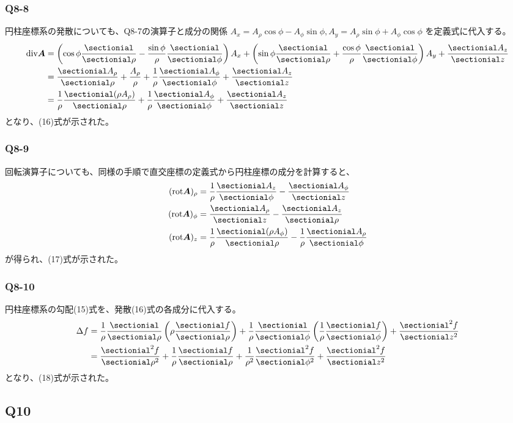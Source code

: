\documentclass[platex,dvipdfmx,a4paper]{jsarticle}
\newcommand{\hb}[2]{\frac{\sectionial #1}{\sectionial #2}}
\newcommand{\vect}[1]{\boldsymbol{#1}}
\begin{document}
  \subsubsection*{Q8-8}
  円柱座標系の発散についても、Q8-7の演算子と成分の関係 $A_x = A_\rho \cos{\phi} - A_\phi \sin{\phi}, A_y = A_\rho \sin{\phi} + A_\phi \cos{\phi}$ を定義式に代入する。
  \begin{align*}
    \text{div} \vect{A} &= \left( \cos{\phi}\hb{}{\rho} - \frac{\sin{\phi}}{\rho}\hb{}{\phi} \right) A_x + \left( \sin{\phi}\hb{}{\rho} + \frac{\cos{\phi}}{\rho}\hb{}{\phi} \right) A_y + \hb{A_z}{z} \\
    &= \hb{A_\rho}{\rho} + \frac{A_\rho}{\rho} + \frac{1}{\rho}\hb{A_\phi}{\phi} + \hb{A_z}{z} \\
    &= \frac{1}{\rho}\hb{(\rho A_\rho)}{\rho} + \frac{1}{\rho}\hb{A_\phi}{\phi} + \hb{A_z}{z}
  \end{align*}
  となり、(16)式が示された。

  \subsubsection*{Q8-9}
  回転演算子についても、同様の手順で直交座標の定義式から円柱座標の成分を計算すると、
  \begin{align*}
    (\text{rot} \vect{A})_\rho &= \frac{1}{\rho}\hb{A_z}{\phi} - \hb{A_\phi}{z} \\
    (\text{rot} \vect{A})_\phi &= \hb{A_\rho}{z} - \hb{A_z}{\rho} \\
    (\text{rot} \vect{A})_z &= \frac{1}{\rho}\hb{(\rho A_\phi)}{\rho} - \frac{1}{\rho}\hb{A_\rho}{\phi}
  \end{align*}
  が得られ、(17)式が示された。

  \subsubsection*{Q8-10}
  円柱座標系の勾配(15)式を、発散(16)式の各成分に代入する。
  \begin{align*}
    \Delta f &= \frac{1}{\rho}\hb{}{\rho}\left( \rho \hb{f}{\rho} \right) + \frac{1}{\rho}\hb{}{\phi}\left( \frac{1}{\rho}\hb{f}{\phi} \right) + \hb{^2 f}{z^2} \\
    &= \hb{^2 f}{\rho^2} + \frac{1}{\rho}\hb{f}{\rho} + \frac{1}{\rho^2}\hb{^2 f}{\phi^2} + \hb{^2 f}{z^2}
  \end{align*}
  となり、(18)式が示された。

  \subsection*{Q10}
\end{document}
